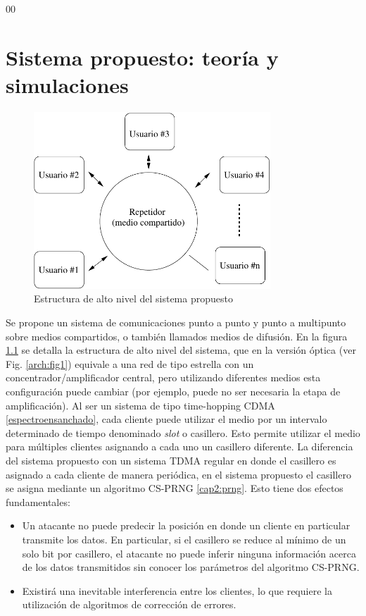 00\chapter{Sistema propuesto: teoría y simulaciones}

\begin{figure}[t]
\centering
\includegraphics[width=3.5in]{graphs/hub}
\caption{Estructura de alto nivel del sistema propuesto}
\label{fig_hub}
\end{figure}

Se propone un sistema de comunicaciones punto a punto y punto a multipunto sobre medios compartidos, o también llamados medios de difusión. En la figura \ref{fig_hub} se detalla la estructura de alto nivel del sistema, que en la versión óptica (ver Fig. \ref{arch:fig1}) equivale a una red de tipo estrella con un concentrador/amplificador central, pero utilizando diferentes medios esta configuración puede cambiar (por ejemplo, puede no ser necesaria la etapa de amplificación).
Al ser un sistema de tipo time-hopping CDMA \ref{espectroensanchado}, cada cliente puede utilizar el medio por un intervalo determinado de tiempo denominado \textit{slot} o casillero. Esto permite utilizar el medio para múltiples clientes asignando a cada uno un casillero diferente. La diferencia del sistema propuesto con un sistema TDMA regular en donde el casillero es asignado a cada cliente de manera periódica, en el sistema propuesto el casillero se asigna mediante un algoritmo CS-PRNG \ref{cap2:prng}. Esto tiene dos efectos fundamentales: 

\begin{itemize}
 \item Un atacante no puede predecir la posición en donde un cliente en particular transmite los datos. En particular, si el casillero se reduce al mínimo de un solo bit por casillero, el atacante no puede inferir ninguna información acerca de los datos transmitidos sin conocer los parámetros del algoritmo CS-PRNG.
 \item Existirá una inevitable interferencia entre los clientes, lo que requiere la utilización de algoritmos de corrección de errores.
\end{itemize}

